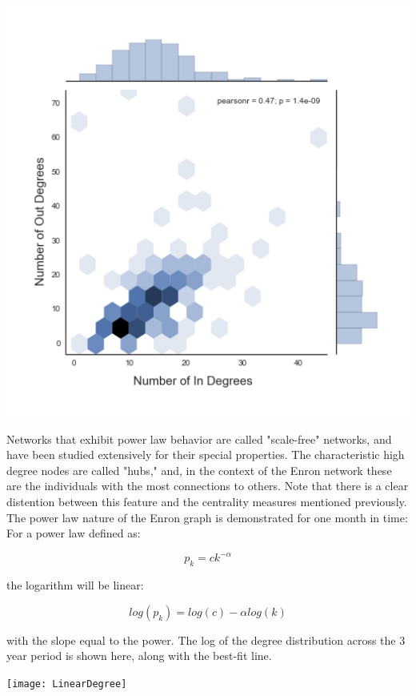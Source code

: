 \documentclass[12pt]{article}
\begin{document}
\begin{itemize}
\includegraphics[width=1\textwidth]{JointDegreeDistribution}

Networks that exhibit power law behavior are called "scale-free" networks, and have been studied extensively for their special properties. The characteristic high degree nodes are called "hubs," and, in the context of the Enron network these are the individuals with the most connections to others. Note that there is a clear distention between this feature and the centrality measures mentioned previously. The power law nature of the Enron graph is demonstrated for one month in time:
For a power law defined as:

	\begin{equation}
		p_k = ck^{-\alpha}		
	\end{equation}


the logarithm will be linear:

	\begin{equation}
		log(p_k) = log(c)-\alpha log(k)		
	\end{equation}
	
with the slope equal to the power.
The log of the degree distribution across the 3 year period is shown here, along with the best-fit line. 

\texttt{[image: LinearDegree]}


\end{itemize}
\end{document}
